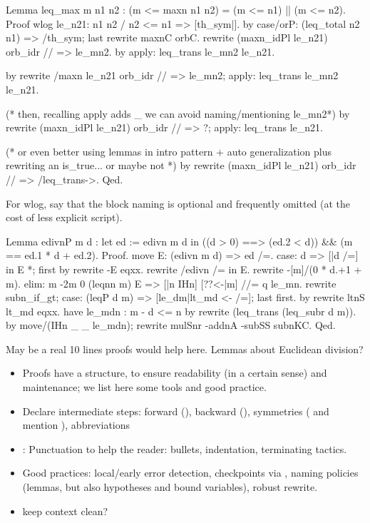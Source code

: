 \begin{coq}{}{}
Lemma leq_max m n1 n2 : (m <= maxn n1 n2) = (m <= n1) || (m <= n2).
Proof
wlog le_n21: n1 n2 / n2 <= n1 => [th_sym|].
  by case/orP: (leq_total n2 n1) => /th_sym; last rewrite maxnC orbC.
rewrite (maxn_idPl le_n21) orb_idr // => le_mn2.
by apply: leq_trans le_mn2 le_n21.

by rewrite /maxn le_n21 orb_idr // => le_mn2; apply: leq_trans le_mn2 le_n21.

(* then, recalling apply adds _ we can avoid naming/mentioning le_mn2*)
by rewrite (maxn_idPl le_n21) orb_idr // => ?; apply: leq_trans le_n21.

(* or even better using lemmas in intro pattern + auto generalization
   plus rewriting an is_true... or maybe not *)
by rewrite (maxn_idPl le_n21) orb_idr // => /leq_trans->.
Qed.
\end{coq}

For wlog, say that the block naming  is optional and frequently
omitted (at the cost of less explicit script).

\begin{coq}{}{}
Lemma edivnP m d :
 let ed := edivn m d in
   ((d > 0) ==> (ed.2 < d)) && (m == ed.1 * d + ed.2).
Proof.
move E: (edivn m d) => ed /=.
case: d => [|d /=] in E *; first by rewrite -E eqxx.
rewrite /edivn /= in E.
rewrite -[m]/(0 * d.+1 + m).
elim: m {-2}m 0 (leqnn m) E => [|n IHn] [??<-|m] //= q le_mn.
rewrite subn_if_gt; case: (leqP d m) => [le_dm|lt_md <- /=]; last first.
  by rewrite ltnS lt_md eqxx.
have le_mdn : m - d <= n by rewrite (leq_trans (leq_subr d m)).
by move/(IHn _ _ le_mdn); rewrite mulSnr -addnA -subSS subnKC.
Qed.
\end{coq}

May be a real 10 lines proofs would help here. Lemmas about Euclidean
division?
 \begin{itemize}
\item Proofs have a structure, to ensure readability (in a certain
  sense) and maintenance; we list here some tools and good practice.
\item Declare intermediate steps: forward (), backward
  (), symmetries ( and mention ),
abbreviations 
\item: Punctuation to help the reader: bullets, indentation,
  terminating tactics.
\item Good practices: local/early error detection, checkpoints via
  , naming policies (lemmas, but also hypotheses and bound
  variables), robust rewrite.
\item keep context clean?
\end{itemize}

